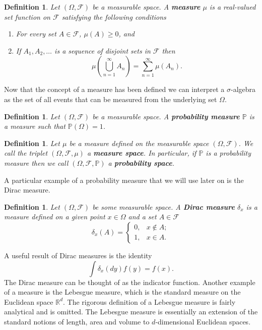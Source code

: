 \documentclass[honours,12pt]{UNSWthesis}
\newcommand{\R}{\mathbb{R}}
\newcommand{\PP}{\mathbb{P}}
\newcommand{\1}{\mathbf 1}
\newcommand{\FF}{\mathcal{F}}
\newtheorem{definition}[theorem]{Definition}
\numberwithin{equation}{section}
\theoremstyle{definition}
\theoremstyle{remark}
\begin{document}
\begin{definition}
Let $(\Omega,\FF)$ be a measurable space. A \textbf{measure} $\mu$ is a real-valued set function on $\FF$ satisfying the following conditions
\begin{enumerate}
\item For every set $A\in \FF$, $\mu(A) \geq 0$, and
\item If $A_1, A_2,\ldots$ is a sequence of disjoint sets in $\FF$ then 
\[
\mu\left(\bigcup_{n=1}^\infty A_n\right) = \sum_{n=1}^\infty \mu(A_n).
\]
\end{enumerate}
\end{definition}
\noindent Now that the concept of a measure has been defined we can interpret a $\sigma$-algebra as the set of all events that can be measured from the underlying set $\Omega$.\\
\begin{definition}
Let $(\Omega,\FF)$ be a measurable space. A \textbf{probability measure} $\PP$ is a measure such that $\PP(\Omega) = 1$.\\
\end{definition}
\begin{definition}
Let $\mu$ be a measure defined on the measurable space $(\Omega,\FF)$. We call the triplet $(\Omega,\FF,\mu)$ a \textbf{measure space}. In particular, if $\PP$ is a probability measure then we call $(\Omega,\FF,\PP)$ a \textbf{probability space}.\\
\end{definition}

{\noindent}A particular example of a probability measure that we will use later on is the Dirac measure.\\
\begin{definition} Let $(\Omega, \FF)$ be some measurable space. A \textbf{Dirac measure} $\delta_x$ is a measure defined on a given point $x\in \Omega$ and a set $A\in \FF$ 
\[
\delta_x(A) = 
\begin{cases}
0, &x\notin A;\\
1, &x\in A.
\end{cases}
\]
\end{definition}
{\noindent}A useful result of Dirac measures is the identity
\[
\int \delta_x(dy) f(y) = f(x).
\]
The Dirac measure can be thought of as the indicator function. Another example of a measure is the Lebesgue measure, which is the standard measure on the Euclidean space $\R^d$. The rigorous definition of a Lebesgue measure is fairly analytical and is omitted. The Lebesgue measure is essentially an extension of the standard notions of length, area and volume to $d$-dimensional Euclidean spaces.\\
\end{document}
